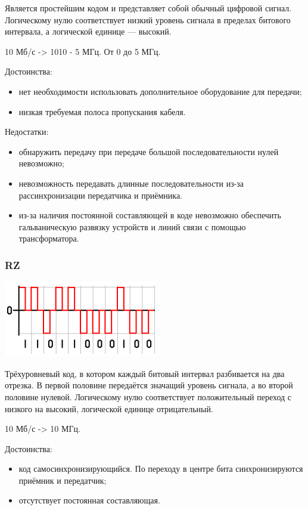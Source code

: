 \documentclass[12pt, russian, oneside, article]{ncc}
\begin{document}
Является простейшим кодом и представляет собой обычный цифровой сигнал. Логическому нулю соответствует низкий уровень сигнала в пределах битового интервала, а логической единице --- высокий.

10 Мб/с -> 1010 - 5 МГц. От 0 до 5 МГц.

Достоинства:
\begin{itemize}
\item нет необходимости использовать дополнительное оборудование для  передачи;
\item низкая требуемая полоса пропускания кабеля.
\end{itemize}

Недостатки:
\begin{itemize}
\item обнаружить передачу при передаче большой последовательности нулей невозможно;
\item невозможность передавать длинные последовательности из-за рассинхронизации передатчика и приёмника.
\item из-за наличия постоянной составляющей в коде невозможно обеспечить гальваническую развязку устройств и линий связи с помощью трансформатора.
\end{itemize}
\subsubsection{RZ}
\label{sec-4_7_2}


\includegraphics[width=0.5\textwidth]{images/SiSPI/RZcode.png}

Трёхуровневый код, в котором каждый битовый интервал разбивается на два отрезка. В первой половине передаётся значащий уровень сигнала, а во второй половине нулевой. Логическому нулю соответствует положительный переход с низкого на высокий, логической единице отрицательный.

10 Мб/с -> 10 МГц.

Достоинства:
\begin{itemize}
\item код самосинхронизирующийся. По переходу в центре бита синхронизируются приёмник и передатчик;
\item отсутствует постоянная составляющая.
\end{itemize}
\end{document}
